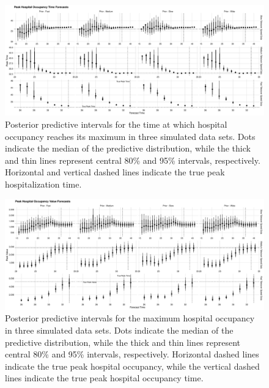 \begin{figure}
    \centering
    \includegraphics[width=1.0\columnwidth]{sensitivity_simulated_peak_assessment_time_plot}
    \caption[Posterior predictive intervals for peak hospital occupancy timing for simulated data sets.]{Posterior predictive intervals for the time at which hospital occupancy reaches its maximum in three simulated data sets.
    Dots indicate the median of the predictive distribution, while the thick and thin lines represent central 80\% and 95\% intervals, respectively.
    Horizontal and vertical dashed lines indicate the true peak hospitalization time.}
    \label{ch_5:fig:sensitivity_simulated_peak_assessment_time_plot}
\end{figure}

\begin{figure}
    \centering
    \includegraphics[width=1.0\columnwidth]{sensitivity_simulated_peak_assessment_value_plot}
    \caption[Posterior predictive intervals for peak hospital occupancy for simulated data sets.]{Posterior predictive intervals for the maximum hospital occupancy in three simulated data sets.
    Dots indicate the median of the predictive distribution, while the thick and thin lines represent central 80\% and 95\% intervals, respectively.
    Horizontal dashed lines indicate the true peak hospital occupancy, while the vertical dashed lines indicate the true peak hospital occupancy time.}
    \label{ch_5:fig:sensitivity_simulated_peak_assessment_value_plot}
\end{figure}


